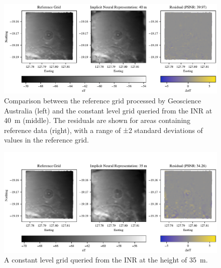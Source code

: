 \begin{landscape}
    \begin{figure}[hbtp]
        \centering
        \includegraphics[width=1.0\linewidth]{fig/p3/P864_grid_comparison_40m.pdf}
        \caption[Grid prediction at the nominal altitude]{Comparison between the reference grid processed by Geoscience Australia (left) and the constant level grid queried from the INR at \qty{40}{\m} (middle). The residuals are shown for areas containing reference data (right), with a range of ±2 standard deviations of values in the reference grid.}
        \label{fig:grid40}
    \end{figure}
\end{landscape}

\begin{landscape}
    \begin{figure}[hbtp]
        \centering
        \includegraphics[width=1.0\linewidth]{fig/p3/P864_grid_comparison_35m.pdf}
        \caption[Grid prediction outside the nominal altitude]{A constant level grid queried from the INR at the height of \qty{35}{\m}.}
        \label{fig:grid35}
    \end{figure}
\end{landscape}


